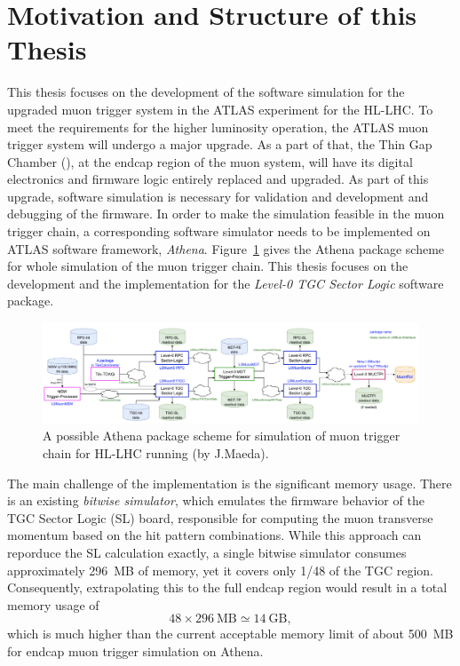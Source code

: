 \section{Motivation and Structure of this Thesis} \label{sec:motivation}
This thesis focuses on the development of the software simulation for the upgraded muon trigger system in the ATLAS experiment for the HL-LHC. To meet the requirements for the higher luminosity operation, the ATLAS muon trigger system will undergo a major upgrade. As a part of that, the Thin Gap Chamber (\TGC), at the endcap region of the muon system, will have its digital electronics and firmware logic entirely replaced and upgraded. As part of this upgrade, software simulation is necessary for validation and development and debugging of the firmware. In order to make the simulation feasible in the muon trigger chain, a corresponding software simulator needs to be implemented on ATLAS software framework, \textit{Athena}. Figure~\ref{fig:L0_trigger_chain} gives the Athena package scheme for whole simulation of the muon trigger chain. This thesis focuses on the development and the implementation for the \textit{Level-0 TGC Sector Logic} software package.

\begin{figure}[htbp]
  \centering
  \includegraphics[width=1.0\textwidth]{figs/chapter1/L0_trigger_chain.png}
  \caption{A possible Athena package scheme for simulation of muon trigger chain for HL-LHC running (by J.Maeda).}
  \label{fig:L0_trigger_chain}
\end{figure}

The main challenge of the implementation is the significant memory usage. There is an existing \textit{bitwise simulator}, which emulates the firmware behavior of the TGC Sector Logic (SL) board, responsible for computing the muon transverse momentum based on the hit pattern combinations. While this approach can reporduce the SL calculation exactly, a single bitwise simulator consumes approximately 296~MB of memory, yet it covers only 1/48 of the TGC region. Consequently, extrapolating this to the full endcap region would result in a total memory usage of
\[
48 \times 296~\text{MB} \simeq 14~\text{GB},
\]
which is much higher than the current acceptable memory limit of about 500~MB for endcap muon trigger simulation on Athena.

